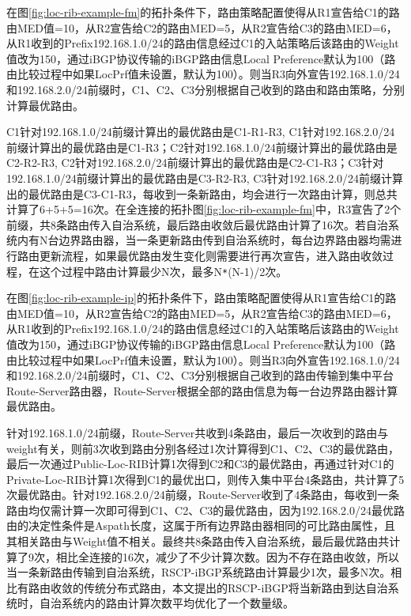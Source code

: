 在图\ref{fig:loc-rib-example-fm}的拓扑条件下，路由策略配置使得从R1宣告给C1的路由MED值=10，从R2宣告给C2的路由MED=5，从R2宣告给C3的路由MED=6，从R1收到的Prefix192.168.1.0/24的路由信息经过C1的入站策略后该路由的Weight值改为150，通过iBGP协议传输的iBGP路由信息Local Preference默认为100（路由比较过程中如果LocPrf值未设置，默认为100）。则当R3向外宣告192.168.1.0/24和192.168.2.0/24前缀时，C1、C2、C3分别根据自己收到的路由和路由策略，分别计算最优路由。

C1针对192.168.1.0/24前缀计算出的最优路由是C1-R1-R3, C1针对192.168.2.0/24前缀计算出的最优路由是C1-R3；C2针对192.168.1.0/24前缀计算出的最优路由是C2-R2-R3, C2针对192.168.2.0/24前缀计算出的最优路由是C2-C1-R3；C3针对192.168.1.0/24前缀计算出的最优路由是C3-R2-R3, C3针对192.168.2.0/24前缀计算出的最优路由是C3-C1-R3，每收到一条新路由，均会进行一次路由计算，则总共计算了6+5+5=16次。在全连接的拓扑图\ref{fig:loc-rib-example-fm}中，R3宣告了2个前缀，共8条路由传入自治系统，最后路由收敛后最优路由计算了16次。若自治系统内有N台边界路由器，当一条更新路由传到自治系统时，每台边界路由器均需进行路由更新流程，如果最优路由发生变化则需要进行再次宣告，进入路由收敛过程，在这个过程中路由计算最少N次，最多N\verb+*+(N-1)/2次。


在图\ref{fig:loc-rib-example-ip}的拓扑条件下，路由策略配置使得从R1宣告给C1的路由MED值=10，从R2宣告给C2的路由MED=5，从R2宣告给C3的路由MED=6，从R1收到的Prefix192.168.1.0/24的路由信息经过C1的入站策略后该路由的Weight值改为150，通过iBGP协议传输的iBGP路由信息Local Preference默认为100（路由比较过程中如果LocPrf值未设置，默认为100）。则当R3向外宣告192.168.1.0/24和192.168.2.0/24前缀时，C1、C2、C3分别根据自己收到的路由传输到集中平台Route-Server路由器，Route-Server根据全部的路由信息为每一台边界路由器计算最优路由。

针对192.168.1.0/24前缀，Route-Server共收到4条路由，最后一次收到的路由与weight有关，则前3次收到路由分别各经过1次计算得到C1、C2、C3的最优路由，最后一次通过Public-Loc-RIB计算1次得到C2和C3的最优路由，再通过针对C1的Private-Loc-RIB计算1次得到C1的最优出口，则传入集中平台4条路由，共计算了5次最优路由。针对192.168.2.0/24前缀，Route-Server收到了4条路由，每收到一条路由均仅需计算一次即可得到C1、C2、C3的最优路由，因为192.168.2.0/24最优路由的决定性条件是Aspath长度，这属于所有边界路由器相同的可比路由属性，且其相关路由与Weight值不相关。最终共8条路由传入自治系统，最后最优路由共计算了9次，相比全连接的16次，减少了不少计算次数。因为不存在路由收敛，所以当一条新路由传输到自治系统，RSCP-iBGP系统路由计算最少1次，最多N次。相比有路由收敛的传统分布式路由，本文提出的RSCP-iBGP将当新路由到达自治系统时，自治系统内的路由计算次数平均优化了一个数量级。

